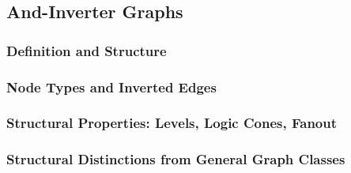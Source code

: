 \subsection{And-Inverter Graphs}
\label{sec:prelim:aig}

\subsubsection{Definition and Structure}
\label{sec:prelim:aig:definition}

\subsubsection{Node Types and Inverted Edges}
\label{sec:prelim:aig:nodes}

\subsubsection{Structural Properties: Levels, Logic Cones, Fanout}
\label{sec:prelim:aig:properties}

\subsubsection{Structural Distinctions from General Graph Classes}
\label{sec:prelim:aig:distinct}
